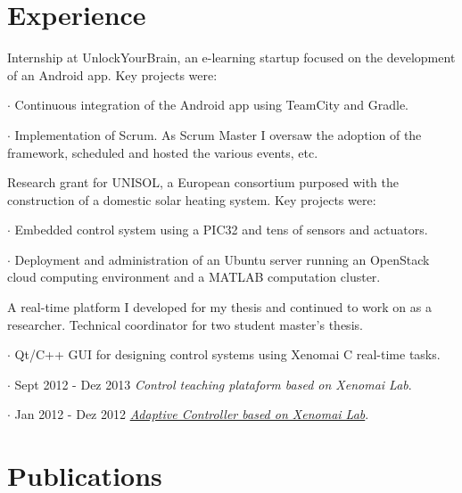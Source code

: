 \section*{Experience}

{
Internship at UnlockYourBrain, an e-learning startup focused on the development
of an Android app. Key projects were:

$\cdot$  Continuous integration of the Android app using TeamCity and Gradle.

$\cdot$  Implementation of Scrum. As Scrum Master I oversaw the
adoption of the framework, scheduled and hosted  the various events, etc.

}

\vspace{\baselineskip}
{
Research grant for UNISOL, a European consortium purposed with the construction
of a domestic solar heating system. Key projects were:

$\cdot$  Embedded control system using a PIC32 and tens of sensors and
actuators.

$\cdot$  Deployment and administration of an Ubuntu server running an
OpenStack cloud computing environment and a MATLAB computation cluster.
}

\vspace{\baselineskip}
{
A real-time platform I developed for my thesis and continued to work on as a
researcher. Technical coordinator for two student master's thesis.

$\cdot$  Qt/C++ GUI for designing control systems using Xenomai C real-time tasks.

$\cdot$ Sept 2012 - Dez 2013 \emph{Control teaching plataform based on Xenomai Lab}.

$\cdot$ Jan 2012 - Dez 2012 \href{http://ria.ua.pt/handle/10773/10933}{\emph{Adaptive Controller based on Xenomai Lab}}.
}

\section*{Publications}

